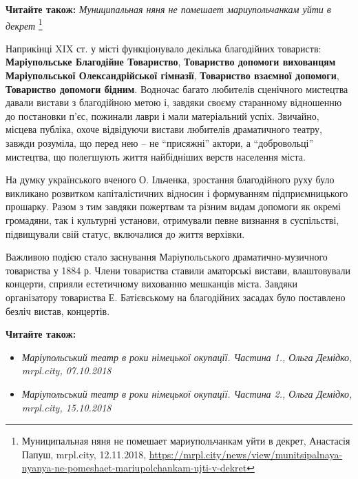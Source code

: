 \textbf{Читайте також:} \emph{Муниципальная няня не помешает мариупольчанкам уйти в декрет}%
\footnote{Муниципальная няня не помешает мариупольчанкам уйти в декрет, Анастасія Папуш, mrpl.city, 12.11.2018, \url{https://mrpl.city/news/view/munitsipalnaya-nyanya-ne-pomeshaet-mariupolchankam-ujti-v-dekret}}

Наприкінці XIX ст. у місті функціонувало декілька благодійних товариств:
\textbf{Маріупольське Благодійне Товариство}, \textbf{Товариство допомоги вихованцям
Маріупольської Олександрійської гімназії}, \textbf{Товариство взаємної допомоги},
\textbf{Товариство допомоги бідним}. Водночас багато любителів сценічного мистецтва
давали вистави з благодійною метою і, завдяки своєму старанному відношенню до
постановки п'єс, пожинали лаври і мали матеріальний успіх. Звичайно, місцева
публіка, охоче відвідуючи вистави любителів драматичного театру, завжди
розуміла, що перед нею – не \enquote{присяжні} актори, а \enquote{добровольці}
мистецтва, що полегшують життя найбідніших верств населення міста.

На думку українського вченого О. Ільченка, зростання благодійного руху було
викликано розвитком капіталістичних відносин і формуванням підприємницького
прошарку. Разом з тим завдяки пожертвам та різним видам допомоги як окремі
громадяни, так і культурні установи, отримували певне визнання в суспільстві,
підвищували свій статус, включалися до життя верхівки.

\vspace{0.5cm}
\begin{minipage}{0.9\textwidth}
Важливою подією стало заснування Маріупольського драматично-музичного
товариства у 1884 р. Члени товариства ставили аматорські вистави, влаштовували
концерти, сприяли естетичному вихованню мешканців міста. Завдяки організатору
товариства Е. Батієвському на благодійних засадах було поставлено безліч
вистав, концертів.
\end{minipage}
\vspace{0.5cm}

\textbf{Читайте також:}

\begin{itemize}
\item \emph{Маріупольський театр в роки німецької окупації. Частина 1., Ольга Демідко, mrpl.city, 07.10.2018}
\item \emph{Маріупольський театр в роки німецької окупації. Частина 2., Ольга Демідко, mrpl.city, 15.10.2018}
\end{itemize}


